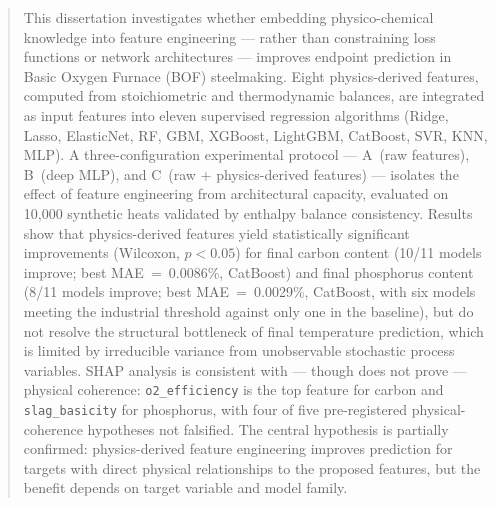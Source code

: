 \documentclass[openright]{normas-utf-tex} %
\begin{document}
\begin{abstract}
This dissertation investigates whether embedding physico-chemical knowledge into feature engineering --- rather than constraining loss functions or network architectures --- improves endpoint prediction in Basic Oxygen Furnace (BOF) steelmaking. Eight physics-derived features, computed from stoichiometric and thermodynamic balances, are integrated as input features into eleven supervised regression algorithms (Ridge, Lasso, ElasticNet, RF, GBM, XGBoost, LightGBM, CatBoost, SVR, KNN, MLP). A three-configuration experimental protocol --- A~(raw features), B~(deep MLP), and C~(raw + physics-derived features) --- isolates the effect of feature engineering from architectural capacity, evaluated on 10,000 synthetic heats validated by enthalpy balance consistency. Results show that physics-derived features yield statistically significant improvements (Wilcoxon, $p < 0.05$) for final carbon content (10/11 models improve; best MAE~=~0.0086\%, CatBoost) and final phosphorus content (8/11 models improve; best MAE~=~0.0029\%, CatBoost, with six models meeting the industrial threshold against only one in the baseline), but do not resolve the structural bottleneck of final temperature prediction, which is limited by irreducible variance from unobservable stochastic process variables. SHAP analysis is consistent with --- though does not prove --- physical coherence: \texttt{o2\_efficiency} is the top feature for carbon and \texttt{slag\_basicity} for phosphorus, with four of five pre-registered physical-coherence hypotheses not falsified. The central hypothesis is partially confirmed: physics-derived feature engineering improves prediction for targets with direct physical relationships to the proposed features, but the benefit depends on target variable and model family.
\end{abstract}

\listadefiguras %
\listadetabelas %
\listadesiglas %
\listadesimbolos %

\sumario %


%
%
%
%
\end{document}
